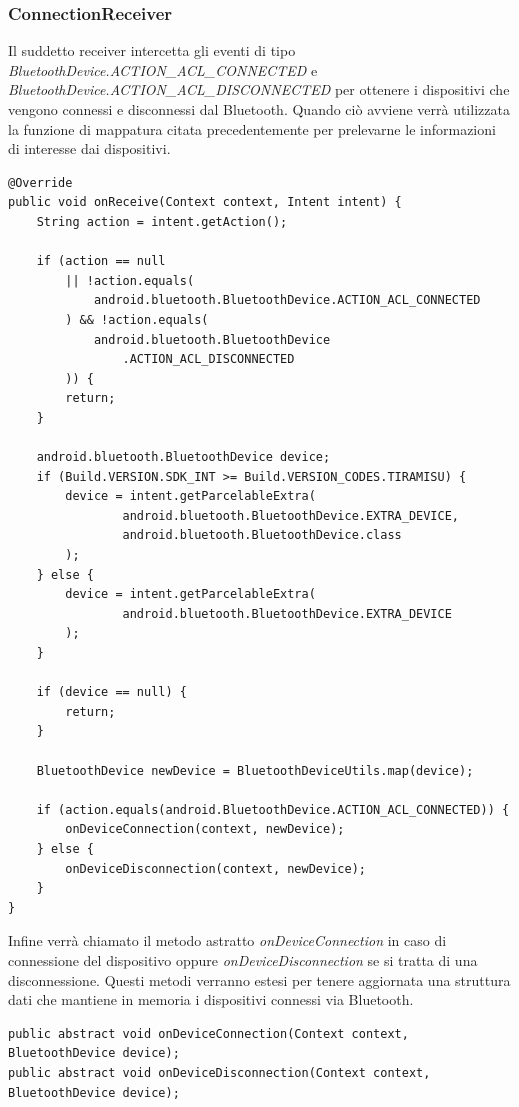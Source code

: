 \subsubsection{ConnectionReceiver}
Il suddetto receiver intercetta gli eventi di tipo \textit{BluetoothDevice.ACTION\_ACL\_CONNECTED} e \textit{BluetoothDevice.ACTION\_ACL\_DISCONNECTED} per ottenere i dispositivi che vengono connessi e disconnessi dal Bluetooth. Quando ciò avviene verrà utilizzata la funzione di mappatura citata precedentemente per prelevarne le informazioni di interesse dai dispositivi.
\begin{verbatim}
@Override
public void onReceive(Context context, Intent intent) {
    String action = intent.getAction();

    if (action == null 
        || !action.equals(
            android.bluetooth.BluetoothDevice.ACTION_ACL_CONNECTED
        ) && !action.equals(
            android.bluetooth.BluetoothDevice
                .ACTION_ACL_DISCONNECTED
        )) {
        return;
    }

    android.bluetooth.BluetoothDevice device;
    if (Build.VERSION.SDK_INT >= Build.VERSION_CODES.TIRAMISU) {
        device = intent.getParcelableExtra(
                android.bluetooth.BluetoothDevice.EXTRA_DEVICE,
                android.bluetooth.BluetoothDevice.class
        );
    } else {
        device = intent.getParcelableExtra(
                android.bluetooth.BluetoothDevice.EXTRA_DEVICE
        );
    }

    if (device == null) {
        return;
    }

    BluetoothDevice newDevice = BluetoothDeviceUtils.map(device);

    if (action.equals(android.BluetoothDevice.ACTION_ACL_CONNECTED)) {
        onDeviceConnection(context, newDevice);
    } else {
        onDeviceDisconnection(context, newDevice);
    }
}
\end{verbatim}

Infine verrà chiamato il metodo astratto \textit{onDeviceConnection} in caso di connessione del dispositivo oppure \textit{onDeviceDisconnection} se si tratta di una disconnessione. Questi metodi verranno estesi per tenere aggiornata una struttura dati che mantiene in memoria i dispositivi connessi via Bluetooth.
\begin{verbatim}
public abstract void onDeviceConnection(Context context, BluetoothDevice device);
public abstract void onDeviceDisconnection(Context context, BluetoothDevice device);
\end{verbatim}

